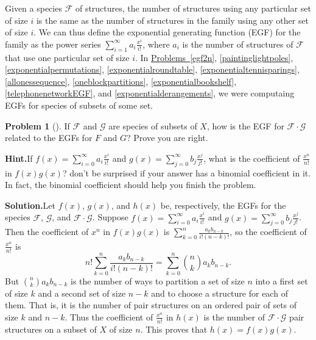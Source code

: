 \documentclass[10pt,]{book}
\theoremstyle{plain}
\theoremstyle{definition}
\newtheorem{activity}[project]{Problem}
\theoremstyle{definition}
\numberwithin{equation}{chapter}
\newcommand{\F}{\mathcal{F}}
\begin{document}
Given a species \(\F\) of structures, the number of structures using any particular set of size \(i\) is the same as the number of structures in the family using any other set of size \(i\).  We can thus define the exponential generating function (EGF) for the family as the power series \(\sum_{i=1}^\infty a_i \frac{x^i}{i!}\), where \(a_i\) is the number of structures of \(\F\) that use one particular set of size \(i\).  In \hyperref[egf2n]{Problems~\ref{egf2n}}, \hyperref[paintinglightpoles]{\ref{paintinglightpoles}}, \hyperref[exponentialpermutations]{\ref{exponentialpermutations}}, \hyperref[exponentialroundtable]{\ref{exponentialroundtable}}, \hyperref[exponentialtennisparings]{\ref{exponentialtennisparings}}, \hyperref[allonessequence]{\ref{allonessequence}}, \hyperref[oneblockpartitions]{\ref{oneblockpartitions}}, \hyperref[exponentialbookshelf]{\ref{exponentialbookshelf}}, \hyperref[telephonenetworkEGF]{\ref{telephonenetworkEGF}}, and \hyperref[exponentialderangements]{\ref{exponentialderangements}}, we were computaing EGFs for species of subsets of some set.%
\begin{activity}[]\label{activity-397}
If \(\F\) and \(\mathcal{G}\) are species of subsets of \(X\), how is the EGF for \(\F\cdot \mathcal{G}\) related to the EGFs for \(F\) and \(G\)?  Prove you are right.%
\par\medskip\noindent%
\textbf{Hint.}\quad If \(f(x) = \sum_{i=0}^\infty a_i \frac{x^i}{i!}\) and \(g(x) = \sum_{j=0}^\infty b_j\frac{x^j}{j!}\), what is the coefficient of \(\frac{x^n}{n!}\) in \(f(x)g(x)\)?  don't be surprised if your answer has a binomial coefficient in it.  In fact, the binomial coefficient should help you finish the problem.%
\par\medskip\noindent%
\textbf{Solution.}\quad Let \(f(x)\), \(g(x)\), and \(h(x)\) be, respectively, the EGFs for the species \(\F\), \(\mathcal{G}\), and \(\F\cdot\mathcal{G}\).  Suppose \(f(x) = \sum_{i=0}^\infty a_i \frac{x^i}{i!}\) and \(g(x) = \sum_{j=0}^\infty b_j\frac{x^j}{j!}\). Then the coefficient of \(x^n\) in \(f(x)g(x)\) is \(\sum_{k=0}^n \frac{a_kb_{n-k}}{i!(n-k)!}\), so the coefficient of \(\frac{x^n}{n!}\) is%
\begin{equation*}
n!\sum_{k=0}^n \frac{a_kb_{n-k}}{i!(n-k)!} = \sum_{k=0}^n \binom{n}{k} a_kb_{n-k}.
\end{equation*}
But \(\binom{n}{k}a_kb_{n-k}\) is the number of ways to partition a set of size \(n\) into a first set of size \(k\) and a second set of size \(n-k\) and to choose a structure for each of them.  That is, it is the number of pair structures on an ordered pair of sets of size \(k\) and \(n-k\).  Thus the coefficient of \(\frac{x^n}{n!}\) in \(h(x)\) is the number of \(\F\cdot\mathcal{G}\) pair structures on a subset of \(X\) of size \(n\).  This proves that \(h(x) = f(x)g(x)\).%
\end{activity}
\end{document}
